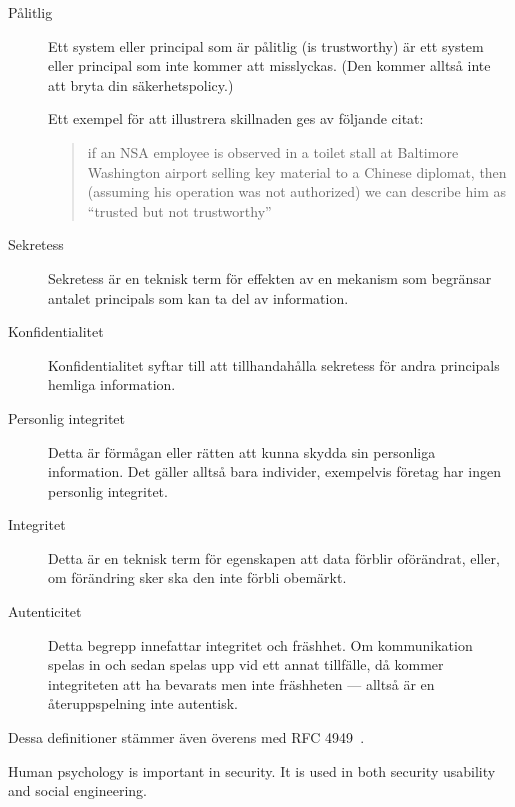 \documentclass[a4paper,addpoints]{exam}
\begin{document}
\begin{questions}
\begin{solution}
\begin{description}
      \item[Pålitlig] Ett system eller principal som är pålitlig 
        (\foreignlanguage{english}{is trustworthy}) är ett system eller 
        principal som inte kommer att misslyckas.
        (Den kommer alltså inte att bryta din säkerhetspolicy.)

        Ett exempel för att illustrera skillnaden ges av följande citat: 
        \blockcquote[s.\ 13]{Anderson2008sea}{%
          if an NSA employee is observed in a toilet stall at Baltimore 
          Washington airport selling key material to a Chinese diplomat, then 
          (assuming his operation was not authorized) we can describe him as 
          \enquote{trusted but not trustworthy}%
        }.

      \item[Sekretess] Sekretess är en teknisk term för effekten av en mekanism 
        som begränsar antalet principals som kan ta del av information.

      \item[Konfidentialitet] Konfidentialitet syftar till att tillhandahålla 
        sekretess för andra principals hemliga information.

      \item[Personlig integritet] Detta är förmågan eller rätten att kunna 
        skydda sin personliga information.
        Det gäller alltså bara individer, exempelvis företag har ingen 
        personlig integritet.

      \item[Integritet] Detta är en teknisk term för egenskapen att data 
        förblir oförändrat, eller, om förändring sker ska den inte förbli 
        obemärkt.

      \item[Autenticitet] Detta begrepp innefattar integritet och fräshhet.
        Om kommunikation spelas in och sedan spelas upp vid ett annat 
        tillfälle, då kommer integriteten att ha bevarats men inte fräshheten 
        --- alltså är en återuppspelning inte autentisk.
    \end{description}
    Dessa definitioner stämmer även överens med RFC 4949~\cite{rfc4949}.
  \end{solution}


  \question\label{q:usability:E:C:A}
  Human psychology is important in security.
  It is used in both security usability and social engineering.
\end{questions}
\end{document}

